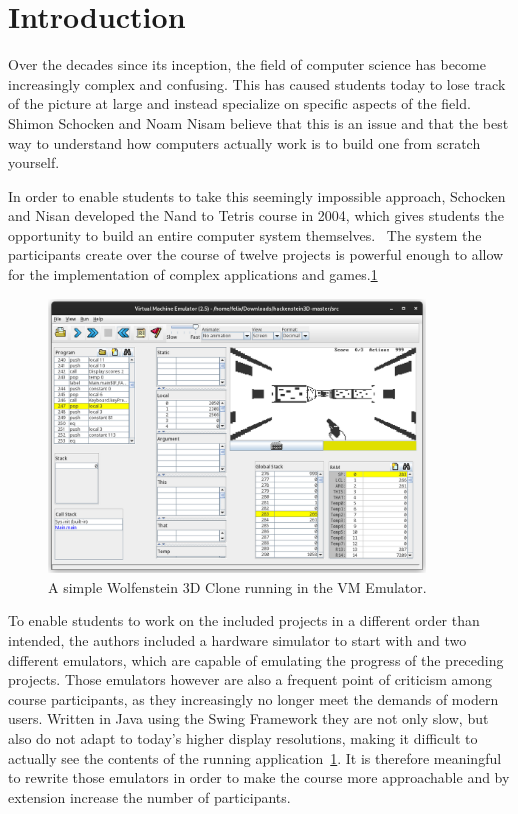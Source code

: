 \section{Introduction}
Over the decades since its inception, the field of computer science has become increasingly complex and confusing.
This has caused students today to lose track of the picture at large and instead specialize on specific aspects of the field.
Shimon Schocken and Noam Nisam believe that this is an issue and that the best way to understand how computers actually work is to build one from scratch yourself.~\cite[Preface]{nisan2005}

In order to enable students to take this seemingly impossible approach, Schocken and Nisan developed the Nand to Tetris course in 2004, which gives students the opportunity to build an entire computer system themselves.~\cite{1408798}
The system the participants create over the course of twelve projects is powerful enough to allow for the implementation of complex applications and games.\ref{fig:hackenstein-offiziell}

\begin{center}
  \begin{figure}[ht]
    \centering
    \includegraphics[width=10cm]{fig/hackenstein-offiziell.png}
    \caption{A simple Wolfenstein 3D Clone running in the VM Emulator.}%
    \label{fig:hackenstein-offiziell}
  \end{figure}
\end{center}

To enable students to work on the included projects in a different order than intended, the authors included a hardware simulator to start with and two different emulators, which are capable of emulating the progress of the preceding projects.
Those emulators however are also a frequent point of criticism among course participants, as they increasingly no longer meet the demands of modern users.
Written in Java using the Swing Framework they are not only slow, but also do not adapt to today's higher display resolutions, making it difficult to actually see the contents of the running application~\ref{fig:hackenstein-offiziell}.
It is therefore meaningful to rewrite those emulators in order to make the course more approachable and by extension increase the number of participants.

